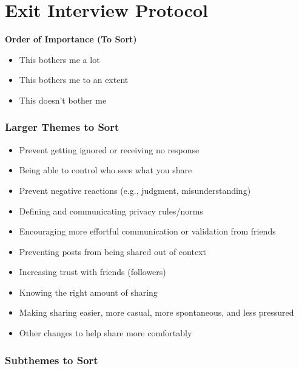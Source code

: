 \section{Exit Interview Protocol}
\label{ref:exit-protocol}

\textbf{Order of Importance (To Sort)}

\begin{itemize}
    \item This bothers me a lot
    \item This bothers me to an extent
    \item This doesn’t bother me
\end{itemize}

\subsubsection*{Larger Themes to Sort}

\begin{itemize}
    \item Prevent getting ignored or receiving no response
    \item Being able to control who sees what you share
    \item Prevent negative reactions (e.g., judgment, misunderstanding)
    \item Defining and communicating privacy rules/norms
    \item Encouraging more effortful communication or validation from friends
    \item Preventing posts from being shared out of context
    \item Increasing trust with friends (followers)
    \item Knowing the right amount of sharing
    \item Making sharing easier, more casual, more spontaneous, and less pressured
    \item Other changes to help share more comfortably
\end{itemize}

\subsubsection*{Subthemes to Sort}

